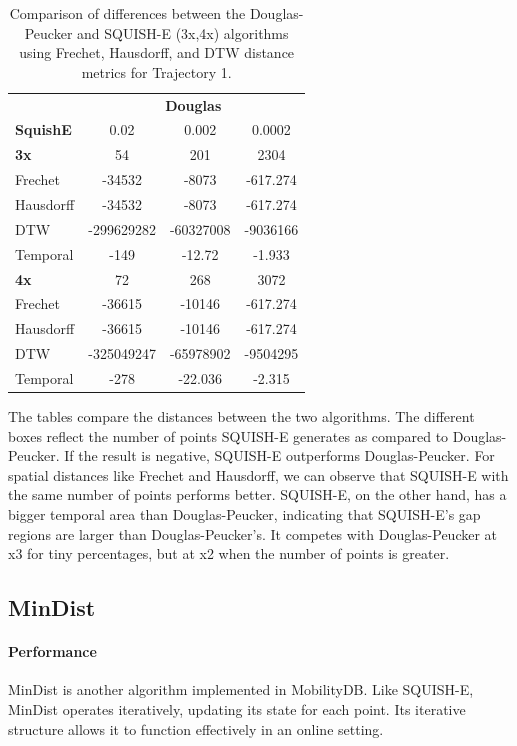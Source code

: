 \begin{table}
	\centering
	\label{tab:douglas_vs_squish_comparison_2}
	\begin{tabular}{@{}lccc@{}}
		\toprule
		& \multicolumn{3}{c}{\textbf{Douglas}} \\
		\cmidrule(l){2-4}
		\textbf{SquishE} & 0.02 & 0.002 & 0.0002 \\
		\midrule
		\textbf{3x} 	& 54 & 201 & 2304 \\
		Frechet 		& -34532 & -8073 & -617.274 \\
		Hausdorff 		& -34532 & -8073 & -617.274 \\
		DTW 		& -299629282 & -60327008 & -9036166 \\
		Temporal 			& -149 & -12.72 & -1.933 \\ \midrule
		\textbf{4x} 	& 72 & 268 & 3072 \\
		Frechet 		& -36615 & -10146 & -617.274 \\
		Hausdorff 		& -36615 & -10146 & -617.274 \\
		DTW 		& -325049247 & -65978902 & -9504295 \\
		Temporal 			& -278 & -22.036 & -2.315 \\
		\bottomrule
	\end{tabular}
	\caption{Comparison of differences between the Douglas-Peucker and SQUISH-E (3x,4x) algorithms using Frechet, Hausdorff, and DTW distance metrics for Trajectory 1.}
\end{table}

The tables  compare the distances between the two algorithms. The different boxes reflect the number of points SQUISH-E generates as compared to Douglas-Peucker.
If the result is negative, SQUISH-E outperforms Douglas-Peucker. For spatial distances like Frechet and Hausdorff, we can observe that SQUISH-E with the same number of points performs better. SQUISH-E, on the other hand, has a bigger temporal area than Douglas-Peucker, indicating that SQUISH-E's gap regions are larger than Douglas-Peucker's. It competes with Douglas-Peucker at x3 for tiny percentages, but at x2 when the number of points is greater.




\subsection{MinDist}
\paragraph{Performance}
MinDist is another algorithm implemented in MobilityDB. Like SQUISH-E, MinDist operates iteratively, updating its state for each point. Its iterative structure allows it to function effectively in an online setting.

